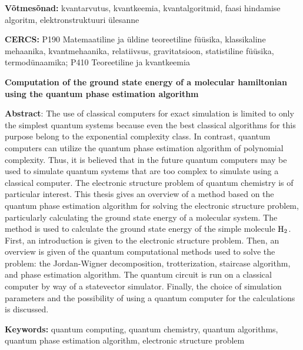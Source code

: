 \documentclass[12pt]{report}
\begin{document}
\vspace*{1ex}

\noindent\textbf{Võtmesõnad:}
kvantarvutus, kvantkeemia, kvantalgoritmid, faasi hindamise algoritm, elektronstruktuuri ülesanne

\vspace*{1ex}

\noindent\textbf{CERCS:}
P190 Matemaatiline ja üldine teoreetiline füüsika, klassikaline mehaanika, kvantmehaanika, relatiivsus, gravitatsioon, statistiline füüsika, termodünaamika;
P410 Teoreetiline ja kvantkeemia

\vspace*{5ex}

\noindent\textbf{\large Computation of the ground state energy of a molecular hamiltonian using the quantum phase estimation algorithm}

\vspace*{1ex}

\noindent\textbf{Abstract}:
The use of classical computers for exact simulation is limited to only the simplest quantum systems because even the best classical algorithms for this purpose belong to the exponential complexity class.
In contrast, quantum computers can utilize the quantum phase estimation algorithm of polynomial complexity.
Thus, it is believed that in the future quantum computers may be used to simulate quantum systems that are too complex to simulate using a classical computer.
The electronic structure problem of quantum chemistry is of particular interest.
This thesis gives an overview of a method based on the quantum phase estimation algorithm for solving the electronic structure problem, particularly calculating the ground state energy of a molecular system.
The method is used to calculate the ground state energy of the simple molecule \(\rm H_2\).
First, an introduction is given to the electronic structure problem.
Then, an overview is given of the quantum computational methods used to solve the problem: the Jordan-Wigner decomposition, trotterization, staircase algorithm, and phase estimation algorithm.
The quantum circuit is run on a classical computer by way of a statevector simulator.
Finally, the choice of simulation parameters and the possibility of using a quantum computer for the calculations is discussed.

\noindent\textbf{Keywords:}
quantum computing, quantum chemistry, quantum algorithms, quantum phase estimation algorithm, electronic structure problem

\vspace*{1ex}
\end{document}

